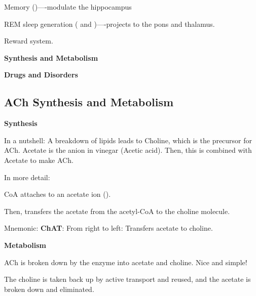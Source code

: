 \begin{coloredlist}
\begin{coloredlist}
\begin{coloredlist}
\begin{coloredlist}
\begin{coloredlist}
                \end{coloredlist}
                \item Memory ()—-modulate the hippocampus
                \item REM sleep generation ( and )—-projects to the pons and thalamus.
                \item Reward system.
            \end{coloredlist}
        \end{coloredlist}
    \end{coloredlist}
    \item \textbf{Synthesis and Metabolism}
    \item \textbf{Drugs and Disorders}
\end{coloredlist}

\subsection{ACh Synthesis and Metabolism}

\begin{coloredlist}
    \item \textbf{Synthesis}
    \begin{coloredlist}
        \item In a nutshell: A breakdown of lipids leads to Choline, which is the precursor for ACh. Acetate is the anion in vinegar (Acetic acid). Then, this is combined with Acetate to make ACh.
        \item In more detail:
        \begin{coloredlist}
            \item CoA attaches to an acetate ion ().
            \item Then,  transfers the acetate from the acetyl-CoA to the choline molecule.
            \item Mnemonic: \textbf{ChAT}: From right to left: Transfers acetate to choline.
        \end{coloredlist}
    \end{coloredlist}
    \item \textbf{Metabolism}
    \begin{coloredlist}
        \item ACh is broken down by the enzyme  into acetate and choline. Nice and simple!
        \item The choline is taken back up by active transport and reused, and the acetate is broken down and eliminated.
    \end{coloredlist}
\end{coloredlist}

